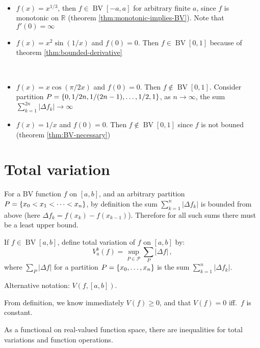 \documentclass{article}
\newcommand{\R}{\mathbb R}
\DeclarePairedDelimiter\set{\lbrace}{\rbrace}
\DeclareMathOperator{\BV}{BV}
\begin{document}
\begin{example}[BV functions] \ 
    \begin{itemize}
        \item $ f(x) = x^{1/3} $, then $ f \in \BV[-a, a] $ for arbitrary finite $ a $, since $ f $ is monotonic on $ \R $ (theorem \ref{thm:monotonic-implies-BV}). Note that $ f'(0) = \infty $
        \item $ f(x) = x^2 \sin (1 / x) $ and $ f(0) = 0 $. Then $ f \in \BV[0, 1] $ because of theorem \ref{thm:bounded-derivative}
    \end{itemize}
\end{example}

\begin{example} \ 
    \begin{itemize}
        \item $ f(x) = x \cos (\pi / 2x) $ and $ f(0) = 0 $. Then $ f \not\in \BV[0, 1] $. Consider partition $ P = \set{0, 1/2n, 1/(2n - 1), \dots, 1/2, 1} $, as $ n \to \infty $, the sum $ \sum_{k=1}^{2n} |\Delta f_k| \to \infty $
        \item $ f(x) = 1/x $ and $ f(0) = 0 $. Then $ f \not\in \BV[0, 1] $ since $ f $ is not bouned (theorem \ref{thm:BV-necessary})
    \end{itemize}
\end{example}


\section{Total variation}
For a BV function $ f $ on $ [a, b] $, and an arbitrary partition $ P = \set{x_0 < x_1 < \cdots < x_n} $, by definition the sum $ \sum_{k=1}^{n} |\Delta f_k| $ is bounded from above (here $ \Delta f_k = f(x_k) - f(x_{k-1}) $). Therefore for all such sums there must be a least upper bound.
\begin{definition}[Total variation]
    If $ f \in \BV[a, b] $, define total variation of $ f $ on $ [a, b] $ by:
    \[ 
        V_{a}^{b} (f) = \sup_{P \in \mathcal P} \sum_{P}|\Delta f| \,,
    \]
    where $ \sum_{P} |\Delta f| $ for a partition $ P = \set{x_0, \dots, x_n} $ is the sum $ \sum_{k=1}^{n} |\Delta f_k| $.
\end{definition}

Alternative notation: $ V(f, [a, b]) $.

From definition, we know immediately $ V(f) \geqslant 0 $, and that $ V(f) = 0 $ iff.\ $ f $ is constant.

As a functional on real-valued function space, there are inequalities for total variations and function operations.
\end{document}
